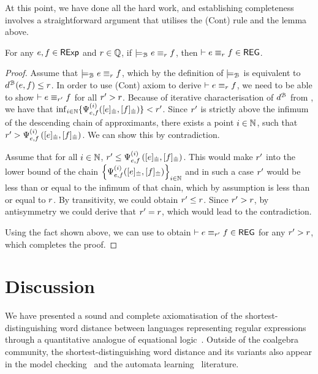 At this point, we have done all the hard work, and establishing completeness involves a straightforward argument that utilises the \textsf{(Cont)} rule and the lemma above.
\begin{theorem}[Completeness]\label{c2:completeness}
       For any $e, f \in \mathsf{RExp}$ and $r \in \mathbb{Q}$, if $\models_{\mathcal{B}} e \equiv_r f$, then $\vdash e \equiv_r f \in \mathsf{REG}$.
\end{theorem}
\begin{proof}
    Assume that $ \models_{\mathcal{B}} e \equiv_r f $, which by the definition of $\models_{\mathcal{B}}$ is equivalent to $d^{\mathcal{B}}(e,f) \leq r$. In order to use \textsf{(Cont)} axiom to derive $\vdash e \equiv_r f$, we need to be able to show $\vdash e \equiv_{r'} f$ for all $r' > r$. Because of iterative characterisation of $d^{\mathcal{B}}$ from , we have that $\inf_{i \in \mathbb{N}} \{{\Psi}_{e,f}^{(i)}([e]_{{\mathrel{\dot\equiv}}},[f]_{{\mathrel{\dot\equiv}}})\} < r'$. Since $r'$ is strictly above the infimum of the descending chain of approximants, there exists a point $i \in \mathbb{N}$, such that $r' > {\Psi}_{e,f}^{(i)} \left([e]_{{\mathrel{\dot\equiv}}}, [f]_{{\mathrel{\dot\equiv}}}\right)$. We can show this by contradiction. 
    
    Assume that for all $i \in \mathbb{N}$, $r' \leq {\Psi}_{e,f}^{(i)}\left([e]_{{\mathrel{\dot\equiv}}}, [f]_{{\mathrel{\dot\equiv}}}\right)$. 
     This would make $r'$ into the lower bound of the chain $\left\{{\Psi}_{e,f}^{(i)}([e]_{{\mathrel{\dot\equiv}}}, [f]_{{\mathrel{\dot\equiv}}})\right\}_{i \in \mathbb{N}}$ and in such a case $r'$ would be less than or equal to the infimum of that chain, which by assumption is less than or equal to $r$. By transitivity, we could obtain $r' \leq r$. Since $r' > r$, by antisymmetry we could derive that $r'= r$, which would lead to the contradiction. 

    Using the fact shown above, we can use  to obtain $\vdash e \equiv_{r'} f \in \mathsf{REG}$ for any $r' > r$, which completes the proof.
\end{proof}
\section{Discussion}\label{c2:sec:discussion}
We have presented a sound and complete axiomatisation of the shortest-distinguishing word distance between languages representing regular expressions through a quantitative analogue of equational logic~\cite{Mardare:2016:Quantitative}. Outside of the coalgebra community, the shortest-distinguishing word distance and its variants also appear in the model checking~\cite{Kwiatkowska:1990:Metric} and the automata learning~\cite{Ferreira:2022:Tree} literature.

